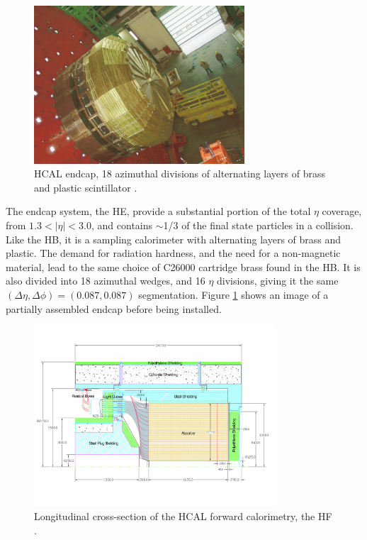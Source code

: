 \begin{figure}[h]
   \centering
  \includegraphics[width=0.7\textwidth]{Figures/CMS_Diagrams/HCAL__Endcap.pdf}
  \caption{HCAL endcap, 18 azimuthal divisions of alternating layers
    of brass and plastic scintillator \cite{CMS:CMS_Machine_Chatrchyan:2008aa}.} \label{fig:hcal_endcap}
\end{figure}

\par The endcap system, the HE, provide a substantial portion of the total
$\eta$ coverage, from $1.3<|\eta|<3.0$, and contains $\sim$1/3 of the
final state particles in a collision.  Like the HB, it is a sampling
calorimeter with alternating layers of brass and plastic.  The demand
for radiation hardness, and the need for a non-magnetic material, lead
to the same choice of C26000 cartridge brass found in the HB.  It is
also divided into 18 azimuthal wedges, and 16 $\eta$ divisions, giving
it the same $(\Delta\eta, \Delta\phi) = (0.087, 0.087)$ segmentation.
Figure \ref{fig:hcal_endcap} shows an image of a partially assembled
endcap before being installed.

\begin{figure}[h]
   \centering
  \includegraphics[width=0.8\textwidth]{Figures/CMS_Diagrams/HCAL__HF_layout.pdf}
  \caption{Longitudinal cross-section of the HCAL forward calorimetry,
  the HF \cite{CMS:CMS_Machine_Chatrchyan:2008aa}. } \label{fig:hcal_hf_layout}
\end{figure}

